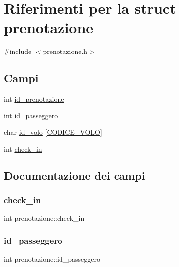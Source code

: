 \hypertarget{structprenotazione}{}\section{Riferimenti per la struct prenotazione}
\label{structprenotazione}


{\ttfamily \#include $<$prenotazione.\+h$>$}

\subsection*{Campi}
\begin{DoxyCompactItemize}
\item 
int \hyperlink{structprenotazione_aff7a4c44ea722bb4392ea60a4ab7733a}{id\+\_\+prenotazione}
\item 
int \hyperlink{structprenotazione_a0d4daec87543f3b222ff5062297cbc62}{id\+\_\+passeggero}
\item 
char \hyperlink{structprenotazione_a8cf5b189dadd542d8d961f5070797194}{id\+\_\+volo} \mbox{[}\hyperlink{costanti_8h_a99ae2e7fbc7078b725a05249bd95f22c}{C\+O\+D\+I\+C\+E\+\_\+\+V\+O\+LO}\mbox{]}
\item 
int \hyperlink{structprenotazione_a2999a6c921ca304f09805f1dfb0a2456}{check\+\_\+in}
\end{DoxyCompactItemize}


\subsection{Documentazione dei campi}
\mbox{\label{structprenotazione_a2999a6c921ca304f09805f1dfb0a2456}} 
\subsubsection{\texorpdfstring{check\+\_\+in}{check\_in}}
{\footnotesize\ttfamily int prenotazione\+::check\+\_\+in}

\mbox{\label{structprenotazione_a0d4daec87543f3b222ff5062297cbc62}} 
\subsubsection{\texorpdfstring{id\+\_\+passeggero}{id\_passeggero}}
{\footnotesize\ttfamily int prenotazione\+::id\+\_\+passeggero}

